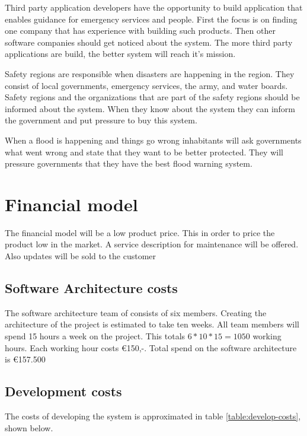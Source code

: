 Third party application developers have the opportunity to build application that enables guidance for emergency services and people. First the focus is on finding one company that has experience with building such products. Then other software companies should get noticed about the system. The more third party applications are build, the better system will reach it's mission.

Safety regions are responsible when disasters are happening in the region. They consist of local governments, emergency services, the army, and water boards. Safety regions and the organizations that are part of the safety regions should be informed about the system. When they know about the system they can inform the government and put pressure to buy this system.

When a flood is happening and things go wrong inhabitants will ask governments what went wrong and state that they want to be better protected. They will pressure governments that they have the best flood warning system.

\section{Financial model}
The financial model will be a low product price. This in order to price the product low in the market. A service description for maintenance will be offered. Also updates will be sold to the customer\\
\subsection{Software Architecture costs}
The software architecture team of \CompanyName consists of six members. Creating the architecture of the project is estimated to take ten weeks. All team members will spend 15 hours a week on the project. This totals $6*10*15=1050$ working hours. Each working hour costs \euro{}150,-. Total spend on the software architecture is \euro{}157.500
\subsection{Development costs}
The costs of developing the system is approximated in table \ref{table:develop-costs}, shown below.
\newline

